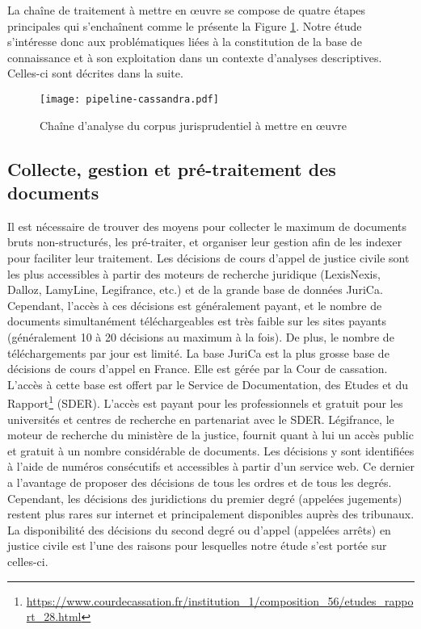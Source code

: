  La chaîne de traitement à mettre en \oe uvre se compose de quatre étapes principales qui s'enchaînent comme le présente la Figure \ref{fig:intro:pipeline-globale}. Notre étude s'intéresse donc aux problématiques liées à la constitution de la base de connaissance et à son exploitation dans un contexte d'analyses descriptives. Celles-ci sont décrites dans la suite.

\begin{figure}[!htb]
	\texttt{[image: pipeline-cassandra.pdf]}
	\caption{Chaîne d'analyse du corpus jurisprudentiel à mettre en \oe uvre} \label{fig:intro:pipeline-globale}
\end{figure} 


\subsection{Collecte, gestion et pré-traitement des documents}
Il est nécessaire de trouver des moyens pour collecter le maximum de documents bruts non-structurés, les pré-traiter, et organiser leur gestion afin de les indexer pour faciliter leur traitement. Les décisions de cours d'appel de justice civile sont les plus accessibles à partir des moteurs de recherche juridique (LexisNexis, Dalloz, LamyLine, Legifrance, etc.) et de la grande base de données JuriCa. Cependant, l'accès à ces décisions est généralement payant, et le nombre de documents simultanément téléchargeables est très faible sur les sites payants (généralement 10 à 20 décisions au maximum à la fois). De plus, le nombre de téléchargements par jour est limité. La base JuriCa est la plus grosse base de décisions de cours d'appel en France. Elle est gérée par la Cour de cassation. L'accès à cette base est offert par le Service de Documentation, des Etudes et du Rapport\footnote{\url{https://www.courdecassation.fr/institution_1/composition_56/etudes_rapport_28.html}} (SDER). L'accès est payant pour les professionnels et gratuit pour les universités et centres de recherche en partenariat avec le SDER. Légifrance, le moteur de recherche du ministère de la justice, fournit quant à lui un accès public et gratuit à un nombre considérable de documents. Les décisions y sont identifiées à l'aide de numéros consécutifs et accessibles à partir d'un service web. Ce dernier a l'avantage de proposer des décisions de tous les ordres et de tous les degrés. Cependant, les décisions des juridictions du premier degré (appelées jugements) restent plus rares sur internet et principalement disponibles auprès des tribunaux.  La disponibilité des décisions du second degré ou d'appel (appelées arrêts) en justice civile est l'une des raisons pour lesquelles notre étude s'est portée sur celles-ci.

